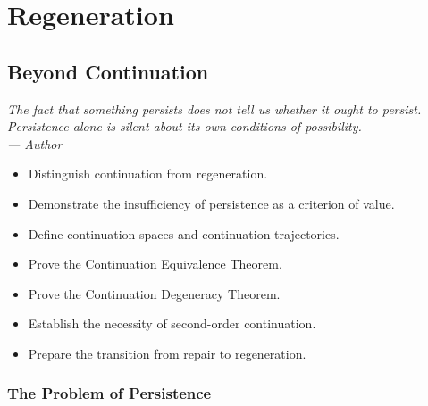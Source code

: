 \documentclass[12pt,twoside,openright]{book}
\newenvironment{epigraph}[2]{%
  \vspace{1em}\begin{flushright}
  \begin{minipage}{0.72\textwidth}
  \itshape\small #1\\[0.4em]
  \upshape\footnotesize\sffamily\color{DistGray}--- #2
  \end{minipage}\end{flushright}\vspace{1.5em}}{}
\newenvironment{objectives}{%
  \begin{tcolorbox}[colback=DistBlue!5,colframe=DistBlue,
    title={\faCheckCircle\enspace Learning Objectives},
    fonttitle=\sffamily\bfseries\color{white},
    attach boxed title to top left={yshift=-2mm,xshift=4mm},
    boxed title style={colback=DistBlue},breakable]
  \begin{itemize}[leftmargin=*,nosep]}{%
  \end{itemize}\end{tcolorbox}\vspace{1em}}
\begin{document}
\part{Regeneration}


\chapter{Beyond Continuation}
\label{ch:beyond-continuation}

\begin{epigraph}{The fact that something persists does not
  tell us whether it ought to persist. Persistence alone is
  silent about its own conditions of possibility.}%
  {Author}
\end{epigraph}

\begin{objectives}
  \item Distinguish continuation from regeneration.
  \item Demonstrate the insufficiency of persistence as a
        criterion of value.
  \item Define continuation spaces and continuation
        trajectories.
  \item Prove the Continuation Equivalence Theorem.
  \item Prove the Continuation Degeneracy Theorem.
  \item Establish the necessity of second-order continuation.
  \item Prepare the transition from repair to regeneration.
\end{objectives}

\section{The Problem of Persistence}
\label{sec:ch10-persistence}
\end{document}
